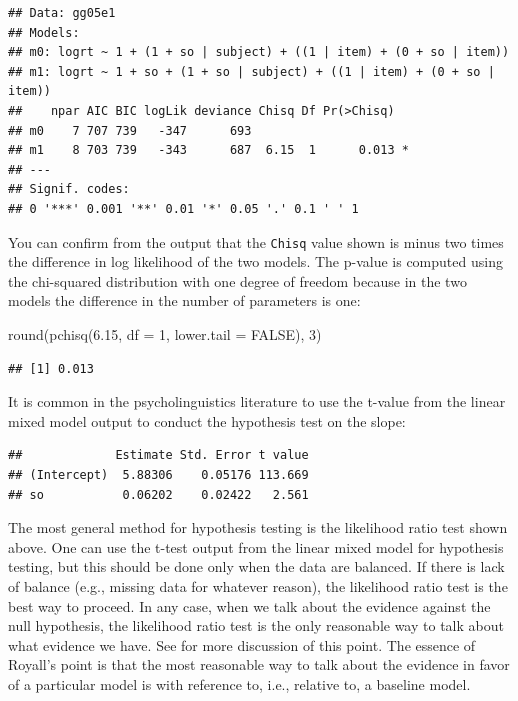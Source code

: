 \documentclass[
  12pt,
]{krantz}
\newenvironment{Shaded}{\begin{snugshade}}{\end{snugshade}}
\newcommand{\AttributeTok}[1]{\textcolor[rgb]{0.77,0.63,0.00}{#1}}
\newcommand{\ConstantTok}[1]{\textcolor[rgb]{0.00,0.00,0.00}{#1}}
\newcommand{\DecValTok}[1]{\textcolor[rgb]{0.00,0.00,0.81}{#1}}
\newcommand{\FloatTok}[1]{\textcolor[rgb]{0.00,0.00,0.81}{#1}}
\newcommand{\FunctionTok}[1]{\textcolor[rgb]{0.00,0.00,0.00}{#1}}
\newcommand{\NormalTok}[1]{#1}
\newcommand{\SpecialCharTok}[1]{\textcolor[rgb]{0.00,0.00,0.00}{#1}}
\theoremstyle{definition}
\theoremstyle{definition}
\theoremstyle{definition}
\theoremstyle{definition}
\theoremstyle{remark}
\begin{document}
\begin{verbatim}
## Data: gg05e1
## Models:
## m0: logrt ~ 1 + (1 + so | subject) + ((1 | item) + (0 + so | item))
## m1: logrt ~ 1 + so + (1 + so | subject) + ((1 | item) + (0 + so | item))
##    npar AIC BIC logLik deviance Chisq Df Pr(>Chisq)  
## m0    7 707 739   -347      693                      
## m1    8 703 739   -343      687  6.15  1      0.013 *
## ---
## Signif. codes:  
## 0 '***' 0.001 '**' 0.01 '*' 0.05 '.' 0.1 ' ' 1
\end{verbatim}

You can confirm from the output that the \texttt{Chisq} value shown is minus two times the difference in log likelihood of the two models. The p-value is computed using the chi-squared distribution with one degree of freedom because in the two models the difference in the number of parameters is one:

\begin{Shaded}
\begin{Highlighting}[]
\FunctionTok{round}\NormalTok{(}\FunctionTok{pchisq}\NormalTok{(}\FloatTok{6.15}\NormalTok{, }\AttributeTok{df =} \DecValTok{1}\NormalTok{, }\AttributeTok{lower.tail =} \ConstantTok{FALSE}\NormalTok{), }\DecValTok{3}\NormalTok{)}
\end{Highlighting}
\end{Shaded}

\begin{verbatim}
## [1] 0.013
\end{verbatim}

It is common in the psycholinguistics literature to use the t-value from the linear mixed model output to conduct the hypothesis test on the slope:

\begin{Shaded}
\end{Shaded}

\begin{verbatim}
##             Estimate Std. Error t value
## (Intercept)  5.88306    0.05176 113.669
## so           0.06202    0.02422   2.561
\end{verbatim}

The most general method for hypothesis testing is the likelihood ratio test shown above. One can use the t-test output from the linear mixed model for hypothesis testing, but this should be done only when the data are balanced. If there is lack of balance (e.g., missing data for whatever reason), the likelihood ratio test is the best way to proceed. In any case, when we talk about the evidence against the null hypothesis, the likelihood ratio test is the only reasonable way to talk about what evidence we have. See \citet{Royall} for more discussion of this point. The essence of Royall's point is that the most reasonable way to talk about the evidence in favor of a particular model is with reference to, i.e., relative to, a baseline model.
\end{document}
